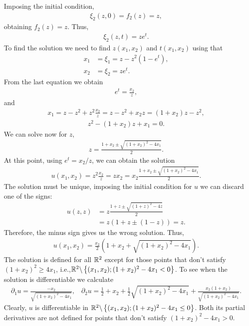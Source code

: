 \begin{questions}
\begin{solution}
Imposing the initial condition,
\begin{align*}
\xi_2(z,0)=f_2(z)=z,
\end{align*}
obtaining $f_2(z)=z$. Thus, 
\begin{align*}
\xi_2(z,t)=ze^t.
\end{align*}
To find the solution we need to find $z(x_1,x_2)$ and $t(x_1,x_2)$ using that
\begin{align*}
x_1&=\xi_1=z-z^2(1-e^t),\\
x_2&=\xi_2=ze^t.
\end{align*}
From the last equation we obtain
\begin{align*}
e^t=\frac{x_2}{z},
\end{align*}
and
\begin{align*}
x_1=z-z^2+z^2\frac{x_2}{z}=z-z^2+x_2z=(1+x_2)z-z^2,
\end{align*}
\begin{align*}
z^2-(1+x_2)z+x_1=0.
\end{align*}
We can solve now for $z$,
\begin{align*}
z=\frac{1+x_2\pm\sqrt{(1+x_2)^2-4x_1}}{2}.
\end{align*}
At this point, using $e^t=x_2/z$, we can obtain the solution
\begin{align*}
u(x_1,x_2)=z^2\frac{x_2}{z}=zx_2=x_2\frac{1+x_2\pm\sqrt{(1+x_2)^2-4x_1}}{2}.
\end{align*}
The solution must be unique, imposing the initial condition for $u$ we can discard one of the signs:
\begin{align*}
u(z,z)&=z\frac{1+z\pm\sqrt{(1+z)^2-4z}}{2}\\
&=z\left(1+z\pm (1-z)\right)=z.
\end{align*}
Therefore, the minus sign gives us the wrong solution. Thus,
\begin{align*}
u(x_1,x_2)=\frac{x_2}{2}\left(1+x_2+\sqrt{(1+x_2)^2-4x_1}\right).
\end{align*}
The solution is defined for all $\mathbb{R}^2$ except for those points that don't satisfy $(1+x_2)^2\geq 4x_1$, i.e.,$\mathbb{R}^2\backslash\left\lbrace (x_1,x_2);(1+x_2)^2-4x_1<0\right\rbrace$. To see when the solution is differentiable we calculate
\begin{align*}
\partial_1u=\frac{-x_2}{\sqrt{(1+x_2)^2-4x_1}},~~~~\partial_2u=\frac{1}{2}+x_2+\frac{1}{2}\sqrt{(1+x_2)^2-4x_1}+\frac{x_2(1+x_2)}{\sqrt{(1+x_2)^2-4x_1}}.
\end{align*}
Clearly, $u$ is differentiable in $\mathbb{R}^2\backslash\left\lbrace (x_1,x_2);(1+x_2)^2-4x_1\leq 0\right\rbrace$. Both its partial derivatives are not defined for points that don't satisfy $(1+x_2)^2-4x_1> 0$.
\end{solution}
\end{questions}